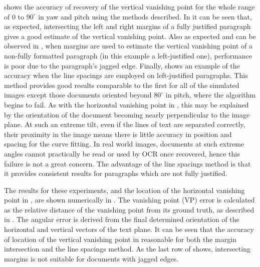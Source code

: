  shows the accuracy of recovery of the vertical vanishing
point for the whole range of $0$ to $90^\circ$ in yaw and pitch using the
methods described.  In  it can be seen that, as expected,
intersecting the left and right margins of a fully justified paragraph gives a
good estimate of the vertical vanishing point.  Also as expected and can be
observed in , when margins are used to estimate the
vertical vanishing point of a non-fully formatted paragraph (in this example a
left-justified one), performance is poor due to the paragraph's jagged edge.
Finally,  shows an example of the accuracy when the line
spacings are employed on left-justified paragraphs. This method provides good
results comparable to the first for all of the simulated images except those
documents oriented beyond $80^\circ$ in pitch, where the algorithm begins to
fail.
As with the horizontal vanishing point in , this may be
explained by the orientation of the document becoming nearly perpendicular to
the image plane. At such an extreme tilt, even if the lines of text are
separated correctly, their proximity in the image means there is little accuracy
in position and spacing for the curve fitting. In real world images, documents
at such extreme angles cannot practically be read or used by OCR once recovered,
hence this failure is not a great concern. The advantage of the line spacings
method is that it provides consistent results for paragraphs which are not fully
justified.

The results for these experiments, and the location of the horizontal vanishing
point in , are shown numerically in
. 
The vanishing point (VP) error is calculated as the relative distance of the
vanishing point from its ground truth, as described in . 
The angular error is derived from the final determined orientation of the
horizontal and vertical vectors of the text plane. 
It can be seen that the accuracy of location of the vertical vanishing point in
reasonable for both the margin intersection and the line spacings method. 
As the last row of  shows, intersecting margins is not
suitable for documents with jagged edges. 

